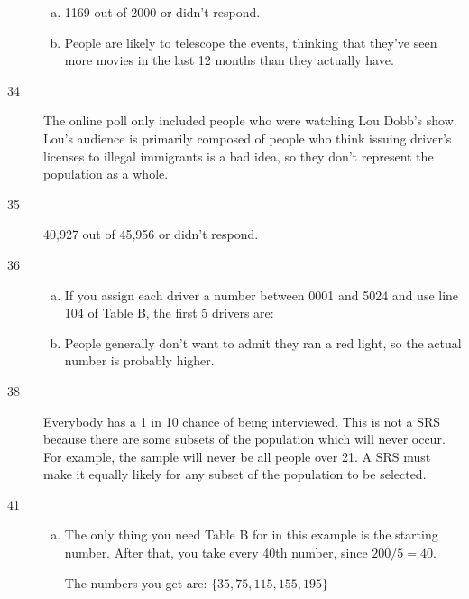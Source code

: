 \documentclass[letterpaper, landscape]{exam}
\begin{document}
\begin{description}
\begin{enumerate}[(a)]
          \item 1169 out of 2000 or  didn't respond.

          \item People are likely to telescope the events, thinking that they've
            seen more movies in the last 12 months than they actually have.
        \end{enumerate}

      \item[34] The online poll only included people who were watching Lou
        Dobb's show.  Lou's audience is primarily composed of people who think
        issuing driver's licenses to illegal immigrants is a bad idea, so they
        don't represent the population as a whole.

      \item[35] 40,927 out of 45,956 or  didn't respond.

      \item[36] 
        \begin{enumerate}[(a)]
          \item If you assign each driver a number between 0001 and 5024 and use
            line 104 of Table B, the first 5 drivers are: 
          

          \item People generally don't want to admit they ran a red light, so
            the actual number is probably higher.
        \end{enumerate}

      \item[38] Everybody has a 1 in 10 chance of being interviewed.  This is
        not a SRS because there are some subsets of the population which will
        never occur. For example, the sample will never be all people over 21. A
        SRS must make it equally likely for any subset of the population to be
        selected.

      \newpage

      \item[41] 
        \begin{enumerate}[(a)]
          \item The only thing you need Table B for in this example is the
          starting number.  After that, you take every 40th number, since
          $200/5 = 40$. 
          
          The numbers you get are: $\boxed{ \{35, 75, 115, 155, 195 \} }$


\end{enumerate}
\end{description}
\end{document}
